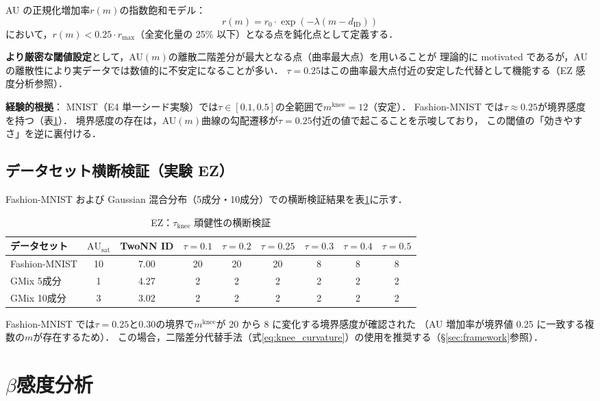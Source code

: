 \documentclass[11pt,a4paper]{jsarticle}
\newcommand{\dID}{d_{\mathrm{ID}}}
\newcommand{\AUsat}{\mathrm{AU}_{\mathrm{sat}}}
\newcommand{\mknee}{m^{\mathrm{knee}}}
\begin{document}
AU の正規化増加率$r(m)$の指数飽和モデル：
\begin{equation}
  r(m) = r_0 \cdot \exp(-\lambda (m - \dID))
  \label{eq:knee_curvature}
\end{equation}
において，$r(m) < 0.25 \cdot r_{\max}$（全変化量の 25\% 以下）となる点を鈍化点として定義する．

\textbf{より厳密な閾値設定}として，AU$(m)$の離散二階差分が最大となる点（曲率最大点）を用いることが
理論的に motivated であるが，AU の離散性により実データでは数値的に不安定になることが多い．
$\tau = 0.25$はこの曲率最大点付近の安定した代替として機能する（EZ 感度分析参照）．

\textbf{経験的根拠}：
MNIST（E4 単一シード実験）では$\tau \in [0.1, 0.5]$の全範囲で$\mknee = 12$（安定）．
Fashion-MNIST では$\tau \approx 0.25$が境界感度を持つ（表\ref{tab:ez}）．
境界感度の存在は，AU$(m)$曲線の勾配遷移が$\tau = 0.25$付近の値で起こることを示唆しており，
この閾値の「効きやすさ」を逆に裏付ける．

\subsection*{データセット横断検証（実験 EZ）}

Fashion-MNIST および Gaussian 混合分布（5成分・10成分）での横断検証結果を表\ref{tab:ez}に示す．

\begin{table}[H]
\centering
\caption{EZ：$\tau_{\mathrm{knee}}$ 頑健性の横断検証}
\label{tab:ez}
\small
\begin{tabular}{lcc|cccccc}
\toprule
データセット & $\AUsat$ & TwoNN ID & $\tau=0.1$ & $\tau=0.2$ & $\tau=0.25$ & $\tau=0.3$ & $\tau=0.4$ & $\tau=0.5$ \\
\midrule
Fashion-MNIST & 10 & 7.00 & 20 & 20 & 20 & 8 & 8 & 8 \\
GMix 5成分 & 1 & 4.27 & 2 & 2 & 2 & 2 & 2 & 2 \\
GMix 10成分 & 3 & 3.02 & 2 & 2 & 2 & 2 & 2 & 2 \\
\bottomrule
\end{tabular}
\end{table}

Fashion-MNIST では$\tau = 0.25$と$0.30$の境界で$\mknee$が 20 から 8 に変化する境界感度が確認された
（AU 増加率が境界値 0.25 に一致する複数の$m$が存在するため）．
この場合，二階差分代替手法（式\eqref{eq:knee_curvature}）の使用を推奨する（§\ref{sec:framework}参照）．

\section{$\beta$感度分析}\label{app:beta}
\end{document}
